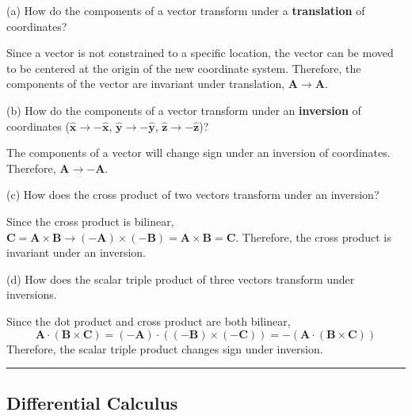 \documentclass{article}
\theoremstyle{definition}
\theoremstyle{remark}
\newcommand{\pline}{\par\noindent\rule{\textwidth}{0.5pt}}
\renewcommand{\vec}{\mathbf}
\newcommand{\veca}{\vec{A}}
\newcommand{\vecb}{\vec{B}}
\newcommand{\vecc}{\vec{C}}
\newcommand{\xhat}{\hat{\vec{x}}}
\newcommand{\yhat}{\hat{\vec{y}}}
\newcommand{\zhat}{\hat{\vec{z}}}
\newcommand{\cross}{\times}
\begin{document}
\begin{description}
	\item{(a)} How do the components of a vector transform under a \textbf{translation} of coordinates?
	
	Since a vector is not constrained to a specific location, the vector can be moved to be centered at the origin of the new coordinate system. Therefore, the components of the vector are invariant under translation, $\veca \to \veca$.
	
	\item{(b)} How do the components of a vector transform under an \textbf{inversion} of coordinates ($\xhat \to -\xhat$, $\yhat \to -\yhat$, $\zhat \to -\zhat$)?
	
	The components of a vector will change sign under an inversion of coordinates. Therefore, $\veca \to -\veca$.
	
	\item{(c)} How does the cross product of two vectors transform under an inversion?
	
	Since the cross product is bilinear, $\vecc = \veca\cross\vecb \to (-\veca)\cross(-\vecb) = \veca\cross\vecb = \vecc$. Therefore, the cross product is invariant under an inversion.
	
	\item{(d)} How does the scalar triple product of three vectors transform under inversions.
	
	Since the dot product and cross product are both bilinear, 
	\[\veca\cdot(\vecb\cross\vecc) = (-\veca)\cdot((-\vecb)\cross(-\vecc)) = -(\veca\cdot(\vecb\cross\vecc))\] Therefore, the scalar triple product changes sign under inversion.
\end{description}
\pline

\subsection{Differential Calculus}
\end{document}
